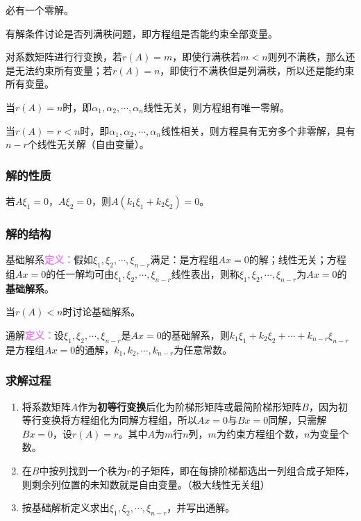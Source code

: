 \documentclass[UTF8, 12pt]{ctexart}
\begin{document}
必有一个零解。

有解条件讨论是否列满秩问题，即方程组是否能约束全部变量。

对系数矩阵进行行变换，若$r(A)=m$，即使行满秩若$m<n$则列不满秩，那么还是无法约束所有变量；若$r(A)=n$，即使行不满秩但是列满秩，所以还是能约束所有变量。

当$r(A)=n$时，即$\alpha_1,\alpha_2,\cdots,\alpha_n$线性无关，则方程组有唯一零解。

当$r(A)=r<n$时，即$\alpha_1,\alpha_2,\cdots,\alpha_n$线性相关，则方程具有无穷多个非零解，具有$n-r$个线性无关解（自由变量）。

\subsubsection{解的性质}

若$A\xi_1=0$，$A\xi_2=0$，则$A(k_1\xi_1+k_2\xi_2)=0$。

\subsubsection{解的结构}

基础解系\textcolor{violet}{\textbf{定义：}}假如$\xi_1,\xi_2,\cdots,\xi_{n-r}$满足：是方程组$Ax=0$的解；线性无关；方程组$Ax=0$的任一解均可由$\xi_1,\xi_2,\cdots,\xi_{n-r}$线性表出，则称$\xi_1,\xi_2,\cdots,\xi_{n-r}$为$Ax=0$的\textbf{基础解系}。

当$r(A)<n$时讨论基础解系。

通解\textcolor{violet}{\textbf{定义：}}设$\xi_1,\xi_2,\cdots,\xi_{n-r}$是$Ax=0$的基础解系，则$k_1\xi_1+k_2\xi_2+\cdots+k_{n-r}\xi_{n-r}$是方程组$Ax=0$的通解，$k_1,k_2,\cdots,k_{n-r}$为任意常数。

\subsubsection{求解过程}

\begin{enumerate}
    \item 将系数矩阵$A$作为\textbf{初等行变换}后化为阶梯形矩阵或最简阶梯形矩阵$B$，因为初等行变换将方程组化为同解方程组，所以$Ax=0$与$Bx=0$同解，只需解$Bx=0$，设$r(A)=r$。其中$A$为$m$行$n$列，$m$为约束方程组个数，$n$为变量个数。
    \item 在$B$中按列找到一个秩为$r$的子矩阵，即在每排阶梯都选出一列组合成子矩阵，则剩余列位置的未知数就是自由变量。（极大线性无关组）
    \item 按基础解析定义求出$\xi_1,\xi_2,\cdots,\xi_{n-r}$，并写出通解。
\end{enumerate}
\end{document}
